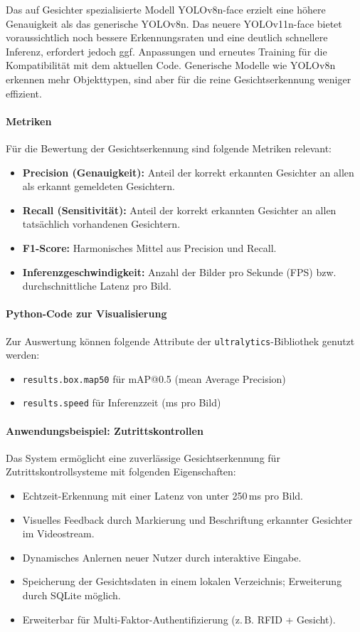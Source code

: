     Das auf Gesichter spezialisierte Modell YOLOv8n-face erzielt eine höhere Genauigkeit als das generische YOLOv8n. Das neuere YOLOv11n-face bietet voraussichtlich noch bessere Erkennungsraten und eine deutlich schnellere Inferenz, erfordert jedoch ggf. Anpassungen und erneutes Training für die Kompatibilität mit dem aktuellen Code. Generische Modelle wie YOLOv8n erkennen mehr Objekttypen, sind aber für die reine Gesichtserkennung weniger effizient.

\paragraph{Metriken}
Für die Bewertung der Gesichtserkennung sind folgende Metriken relevant:
\begin{itemize}
    \item \textbf{Precision (Genauigkeit):} Anteil der korrekt erkannten Gesichter an allen als erkannt gemeldeten Gesichtern.
    \item \textbf{Recall (Sensitivität):} Anteil der korrekt erkannten Gesichter an allen tatsächlich vorhandenen Gesichtern.
    \item \textbf{F1-Score:} Harmonisches Mittel aus Precision und Recall.
    \item \textbf{Inferenzgeschwindigkeit:} Anzahl der Bilder pro Sekunde (FPS) bzw. durchschnittliche Latenz pro Bild.
\end{itemize}

\paragraph{Python-Code zur Visualisierung}

Zur Auswertung können folgende Attribute der \texttt{ultralytics}-Bibliothek genutzt werden:
\begin{itemize}
    \item \texttt{results.box.map50} für mAP@0.5 (mean Average Precision)
    \item \texttt{results.speed} für Inferenzzeit (ms pro Bild)
\end{itemize}

\paragraph{Anwendungsbeispiel: Zutrittskontrollen}
Das System ermöglicht eine zuverlässige Gesichtserkennung für Zutrittskontrollsysteme mit folgenden Eigenschaften:
\begin{itemize}
    \item Echtzeit-Erkennung mit einer Latenz von unter 250\,ms pro Bild.
    \item Visuelles Feedback durch Markierung und Beschriftung erkannter Gesichter im Videostream.
    \item Dynamisches Anlernen neuer Nutzer durch interaktive Eingabe.
    \item Speicherung der Gesichtsdaten in einem lokalen Verzeichnis; Erweiterung durch SQLite möglich.
    \item Erweiterbar für Multi-Faktor-Authentifizierung (z.\,B. RFID + Gesicht).
\end{itemize}


